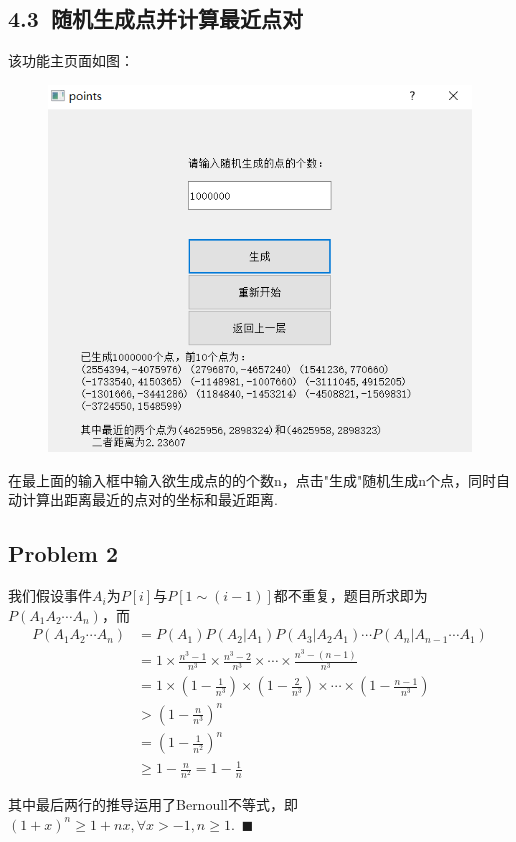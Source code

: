 \documentclass[UTF8]{ctexart}
\begin{document}
\subsection*{4.3\ 随机生成点并计算最近点对}
该功能主页面如图：
\begin{figure}[H]\begin{center}
	\includegraphics[scale = 0.5]{4.png}
\end{center}\end{figure}\par
在最上面的输入框中输入欲生成点的的个数n，点击"生成"随机生成n个点，同时自动计算出距离最近的点对的坐标和最近距离.
\subsection*{Problem 2}
我们假设事件$A_i$为$P[i]$与$P[1\sim(i-1)]$都不重复，题目所求即为$P(A_1A_2\cdots A_n)$，而$$
\begin{aligned}
P(A_1A_2\cdots A_n)&=P(A_1)P(A_2|A_1)P(A_3|A_2A_1)\cdots P(A_n|A_{n-1}\cdots A_1)\\
&=1\times\frac{n^3-1}{n^3}\times\frac{n^3-2}{n^3}\times\cdots\times\frac{n^3-(n-1)}{n^3}\\
&=1\times(1-\frac{1}{n^3})\times(1-\frac{2}{n^3})\times\cdots\times(1-\frac{n-1}{n^3})\\
&>(1-\frac{n}{n^3})^n\\
&=(1-\frac{1}{n^2})^n\\
&\ge 1-\frac{n}{n^2}=1-\frac{1}{n}
\end{aligned}$$\par
其中最后两行的推导运用了Bernoull不等式，即$(1+x)^n\ge 1+nx,\forall x>-1,n\ge 1$.\ $\blacksquare$
\end{document}
